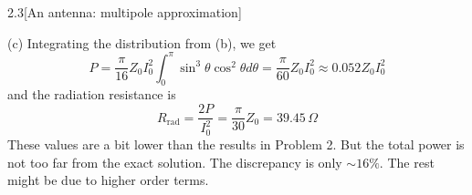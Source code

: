 \documentclass[12pt]{article}
\begin{document}
\begin{problem}{2.3}[An antenna: multipole approximation]
\begin{solution}
(c) Integrating the distribution from (b), we get
\begin{equation}
    P=\frac{\pi}{16}Z_0I_0^2\int_0^\pi\sin^3\theta\cos^2\theta d\theta
    =\frac{\pi}{60}Z_0I_0^2
    \approx0.052 Z_0I_0^2
\end{equation}
and the radiation resistance is
\begin{equation}
    R_\text{rad}=\frac{2P}{I_0^2}=\frac{\pi}{30}Z_0=39.45\,\unit{\Omega}
\end{equation}
These values are a bit lower than the results in Problem 2. But the total power
is not too far from the exact solution. The discrepancy is only $\sim16\%$. The
rest might be due to higher order terms.
\end{solution}
\end{problem}
\end{document}
